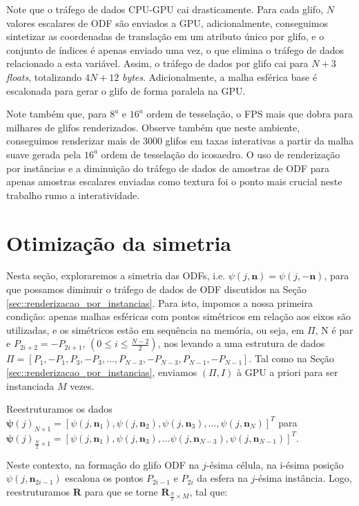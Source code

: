 \documentclass[
    12pt,                %
    oneside,            %
    a4paper,            %
    english,            %
    french,                %
    spanish,            %
    brazil                %
    ]{abntex2}
\begin{document}
Note que o tráfego de dados CPU-GPU cai drasticamente. Para cada glifo, $N$ valores escalares de ODF são enviados a GPU, adicionalmente, conseguimos sintetizar as coordenadas de translação em um atributo único por glifo, e o conjunto de índices é apenas enviado uma vez, o que elimina o tráfego de dados relacionado a esta variável. Assim, o tráfego de dados por glifo cai para $N + 3$ \textit{floats}, totalizando $4N + 12$ \textit{bytes}. Adicionalmente, a malha esférica base é escalonada para gerar o glifo de forma paralela na GPU.

Note também que, para $8^a$ e $16^a$ ordem de tesselação, o FPS mais que dobra para milhares de glifos renderizados. Observe também que neste ambiente, conseguimos renderizar mais de 3000 glifos em taxas interativas \cite{nielsen1994} a partir da malha suave gerada pela $16^a$ ordem de tesselação do icosaedro. O uso de renderização por instâncias e a diminuição do tráfego de dados de amostras de ODF para apenas amostras escalares enviadas como textura foi o ponto mais crucial neste trabalho rumo a interatividade.

\section{Otimização da simetria}
\label{sec::otimizacao_da_simetria}

Nesta seção, exploraremos a simetria das ODFs, i.e. $\psi(j, \mathbf{n}) = \psi(j, -\mathbf{n})$, para que possamos diminuir o tráfego de dados de ODF discutidos na Seção \ref{sec::renderizacao_por_instancias}. Para isto, impomos a nossa primeira condição: apenas malhas esféricas com pontos simétricos em relação aos eixos são utilizadas, e os simétricos estão em sequência na memória, ou seja, em $\Pi$, N é par e $P_{2i+2} = -P_{2i+1}$, $(0 \leq i \leq \frac{N-2}{2})$, nos levando a uma estrutura de dados $\Pi = [P_1, -P_1, P_3, -P_3, \dots, P_{N-3}, -P_{N-3}, P_{N-1}, -P_{N-1}]$. Tal como na Seção \ref{sec::renderizacao_por_instancias}, enviamos $(\Pi, I)$ à GPU a priori para ser instanciada $M$ vezes.

Reestruturamos os dados
$\boldsymbol{\psi}(j)_{N\times 1} = [
\psi(j, \mathbf{n}_1), 
\psi(j, \mathbf{n}_2), 
\psi(j, \mathbf{n}_3), ..., 
\psi(j, \mathbf{n}_N)
]^T$ para
$\boldsymbol{\psi}(j)_{\frac{N}{2}\times 1} =[
\psi(j, \mathbf{n}_1), 
\psi(j, \mathbf{n}_3), ...
\psi(j, \mathbf{n}_{N-3}),
\psi(j, \mathbf{n}_{N-1})
]^T$.

Neste contexto, na formação do glifo ODF na $j$-ésima célula, na i-ésima posição $\psi(j, \mathbf{n}_{2i-1})$ escalona os pontos $P_{2i-1}$ e $P_{2i}$ da esfera na $j$-ésima instância. Logo, reestruturamos $\mathbf{R}$ para que se torne $\mathbf{R}_{\frac{N}{2}\times M}$, tal que:
\end{document}
